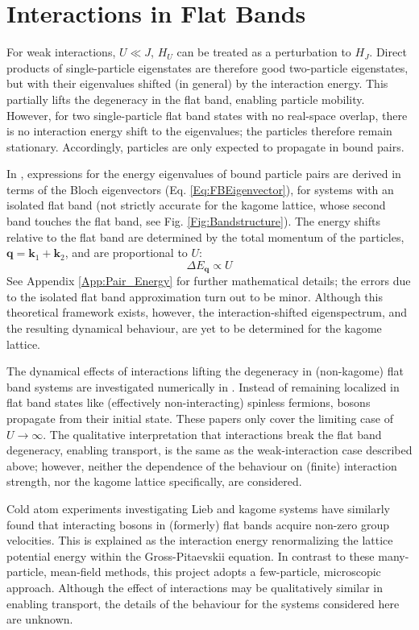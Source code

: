 \section{Interactions in Flat Bands}\label{Sec:WeakInteractionTheory}

For weak interactions, $U\ll J$, $H_U$ can be treated as a perturbation to $H_J$. Direct products of single-particle eigenstates are therefore good two-particle eigenstates, but with their eigenvalues shifted (in general) by the interaction energy. This partially lifts the degeneracy in the flat band, enabling particle mobility. However, for two single-particle flat band states with no real-space overlap, there is no interaction energy shift to the eigenvalues; the particles therefore remain stationary. Accordingly, particles are only expected to propagate in bound pairs.

In \cite{Torma}, expressions for the energy eigenvalues of bound particle pairs are derived in terms of the Bloch eigenvectors (Eq. \ref{Eq:FBEigenvector}), for systems with an isolated flat band (not strictly accurate for the kagome lattice, whose second band touches the flat band, see Fig. \ref{Fig:Bandstructure}). The energy shifts relative to the flat band are determined by the total momentum of the particles, $\textbf{q}=\textbf{k}_1+\textbf{k}_2$, and are proportional to $U$:
\begin{equation}
    \Delta E_{\textbf{q}} \propto U
\end{equation}
See Appendix \ref{App:Pair_Energy} for further mathematical details; the errors due to the isolated flat band approximation turn out to be minor. Although this theoretical framework exists, however, the interaction-shifted eigenspectrum, and the resulting dynamical behaviour, are yet to be determined for the kagome lattice.

The dynamical effects of interactions lifting the degeneracy in (non-kagome) flat band systems are investigated numerically in \cite{Apaja,Hyrkas}. Instead of remaining localized in flat band states like (effectively non-interacting) spinless fermions, bosons propagate from their initial state. These papers only cover the limiting case of $U\rightarrow \infty$. The qualitative interpretation that interactions break the flat band degeneracy, enabling transport, is the same as the weak-interaction case described above; however, neither the dependence of the behaviour on (finite) interaction strength, nor the kagome lattice specifically, are considered.

Cold atom experiments investigating Lieb \cite{Ozawa} and kagome \cite{Leung} systems have similarly found that interacting bosons in (formerly) flat bands acquire non-zero group velocities. This is explained as the interaction energy renormalizing the lattice potential energy within the Gross-Pitaevskii equation. In contrast to these many-particle, mean-field methods, this project adopts a few-particle, microscopic approach. Although the effect of interactions may be qualitatively similar in enabling transport, the details of the behaviour for the systems considered here are unknown.

